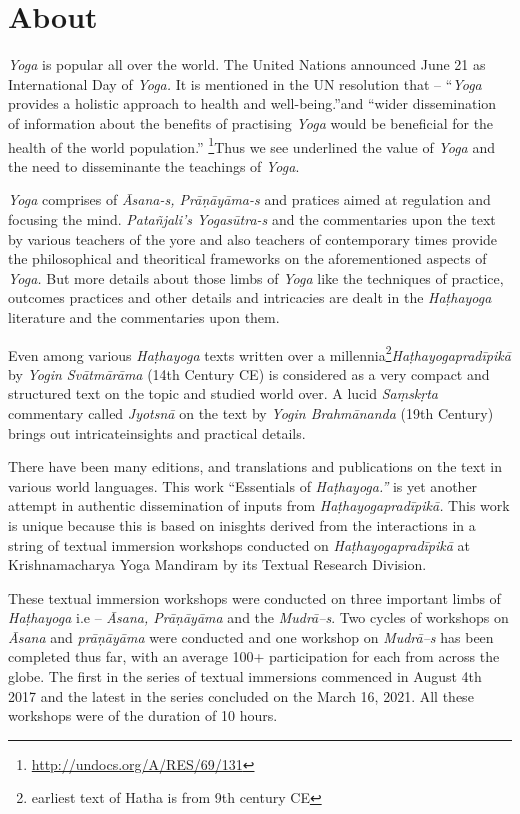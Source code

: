 \thispagestyle{empty}

\chapter*{About}\label{about}

\textit{Yoga} is popular all over the world. The United Nations announced June 21 as International Day of \textit{Yoga.} It is mentioned in the UN resolution that – “\textit{Yoga} provides a holistic approach to health and well-being.”and “wider dissemination of information about the benefits of practising \textit{Yoga} would be beneficial for the health of the world population.” \footnote{\url{http://undocs.org/A/RES/69/131}}Thus we see underlined the value of \textit{Yoga} and the need to disseminante the teachings of \textit{Yoga}.
\medskip

\textit{Yoga} comprises of \textit{Āsana-s, Prāṇāyāma-s} and pratices aimed at regulation and focusing the mind. \textit{Patañjali's Yogasūtra-s} and the commentaries upon the text by various teachers of the yore and also teachers of contemporary times provide the philosophical and theoritical frameworks on the aforementioned aspects of \textit{Yoga.} But more details about those limbs of \textit{Yoga} like the techniques of practice, outcomes practices and other details and intricacies are dealt in the \textit{Haṭhayoga} literature and the commentaries upon them.
\medskip

Even among various \textit{Haṭhayoga} texts written over a millennia\footnote{earliest text of Hatha is from 9th century CE}\break \textit{Haṭhayogapradīpikā} by \textit{Yogin Svātmārāma} (14th Century CE) is considered as a very compact and structured text on the topic and studied world over. A lucid \textit{Saṃskṛta} commentary called \textit{Jyotsnā} on the text by \textit{Yogin Brahmānanda} (19th Century) brings out intricate\break insights and practical details. 
\medskip

There have been many editions, and translations and publications on the text in various world languages. This work “Essentials of \textit{Haṭhayoga.”} is yet another attempt in authentic dissemination of inputs from \textit{Haṭhayogapradīpikā.} This work is unique because this is based on inisghts derived from the interactions in a string of textual immersion workshops conducted on \textit{Haṭhayogapradīpikā} at Krishnamacharya Yoga Mandiram by its Textual Research Division. 
\medskip

These textual immersion workshops were conducted on three important limbs of \textit{Haṭhayoga} i.e – \textit{Āsana, Prāṇāyāma} and the \textit{Mudrā–s}. Two cycles of workshops on \textit{Āsana} and \textit{prāṇāyāma} were conducted and one workshop on \textit{Mudrā–s} has been completed thus far, with an average 100+ participation for each from across the globe. The first in the series of textual immersions commenced in August 4th 2017 and the latest in the series concluded on the March 16, 2021. All these workshops were of the duration of 10 hours.
\medskip

